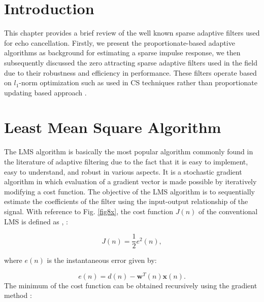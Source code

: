 
\section{Introduction}\label{sec:3.1}
\vspace{-0.5cm}
\noindent This chapter provides a brief review of the well known sparse adaptive filters used for echo cancellation. Firstly, we present the proportionate-based adaptive algorithms as background for estimating a sparse impulse response, we then subsequently discussed the zero attracting sparse adaptive filters used in the field due to their robustness and efficiency in performance. These filters operate based on $l_1$-norm optimization such as used in CS techniques \cite{Dohono} rather than proportionate updating based approach \cite{Duttweiler}.

\vspace{-0.3cm}
\section{Least Mean Square Algorithm}\label{sec:3.2}
\vspace{-0.5cm}
\noindent The LMS algorithm is basically the most popular algorithm commonly found in the literature of adaptive filtering due to the fact that it is easy to implement, easy to understand, and robust in various aspects. It is a stochastic gradient algorithm in which evaluation of a gradient vector is made possible by iteratively modifying a cost function. The objective of the LMS algorithm is to sequentially estimate the coefficients of the filter using the input-output relationship of the signal. With reference to Fig. \ref{fig8x}, the cost function $J(n)$ of the conventional LMS is defined as \cite{Haykins},  \cite{Reddy}:

\vspace{-1.5cm}
\begin{equation}
J(n)=\frac{1}{2}e^2(n),\label{eq1b}
\end{equation}

\vspace{-0.8cm}
\noindent where $e(n)$ is the instantaneous error given by:

\vspace{-1.5cm}
\begin{equation}
e(n)=d(n)-\textbf{w}^T(n)\textbf{x}(n).\label{eq2b}
\end{equation}
\vspace{-1.5cm}
\noindent The minimum of the cost function can be obtained recursively using the gradient method \cite{Haykins}:


